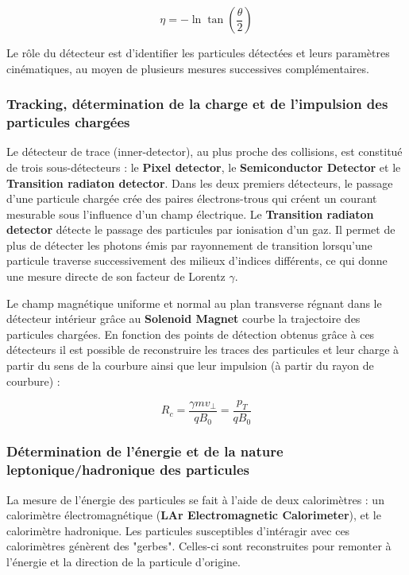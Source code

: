 \documentclass[11pt]{article} %
\begin{document}
\begin{equation}
\eta = -\ln \tan \left (\dfrac{\theta}{2} \right)
\end{equation}

Le rôle du détecteur est d'identifier les particules détectées et  leurs paramètres cinématiques, au moyen de plusieurs mesures successives complémentaires.

\subsubsection{Tracking, détermination de la charge et de l'impulsion des particules chargées}

Le détecteur de trace (inner-detector), au plus proche des collisions, est constitué de trois sous-détecteurs : le \textbf{Pixel detector}, le \textbf{Semiconductor Detector} et le \textbf{Transition radiaton detector}. Dans les deux premiers détecteurs, le passage d'une particule chargée crée des paires électrons-trous qui créent un courant mesurable sous l'influence d'un champ électrique. 
Le \textbf{Transition radiaton detector} détecte le passage des particules par ionisation d'un gaz. Il permet de plus de détecter les photons émis par rayonnement de transition lorsqu'une particule traverse successivement des milieux d'indices différents, ce qui donne une mesure directe de son facteur de Lorentz $\gamma$.

Le champ magnétique uniforme et normal au plan transverse régnant dans le détecteur  intérieur  grâce au \textbf{Solenoid Magnet} courbe la trajectoire des particules chargées. En fonction des points de détection obtenus grâce à ces détecteurs il est possible de reconstruire les traces des particules et leur charge à partir du sens de la courbure ainsi que leur impulsion (à partir du rayon de courbure) :

\begin{equation} 
R_c = \dfrac{\gamma mv_{\perp}}{qB_0} = \dfrac{p_{T}}{qB_0}
\end{equation}

\subsubsection{Détermination de l'énergie et de la nature leptonique/hadronique des particules}

La mesure de l'énergie des particules se fait à l'aide de deux calorimètres : un calorimètre électromagnétique (\textbf{LAr Electromagnetic Calorimeter}), et le calorimètre hadronique. Les particules susceptibles d'intéragir avec ces calorimètres génèrent des "gerbes". Celles-ci sont reconstruites pour remonter à l'énergie et la direction de la particule d'origine.
\end{document}
